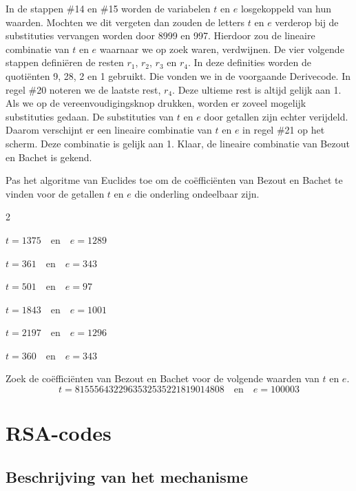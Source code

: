 In de stappen \#14 en \#15 worden de variabelen $t$ en $e$ losgekoppeld van hun waarden. Mochten we dit vergeten dan zouden de letters $t$ en $e$ verderop bij de substituties vervangen worden door 8999 en 997. Hierdoor zou de lineaire combinatie van $t$ en $e$ waarnaar we op zoek waren, verdwijnen. De vier volgende stappen definiëren de resten $r_1$, $r_2$, $r_3$ en $r_4$. In deze definities worden de quotiënten 9, 28, 2 en 1 gebruikt. Die vonden we in de voorgaande Derivecode. In regel \#20 noteren we de laatste rest, $r_4$. Deze ultieme rest is altijd gelijk aan 1. Als we op de vereenvoudigingsknop drukken, worden er zoveel mogelijk substituties gedaan. De substituties van $t$ en $e$ door getallen zijn echter verijdeld. Daarom verschijnt er een lineaire combinatie van $t$ en $e$ in regel \#21 op het scherm. Deze combinatie is gelijk aan 1. Klaar, de lineaire combinatie van Bezout en Bachet is gekend.

\begin{oef}
Pas het algoritme van Euclides toe om de coëfficiënten van Bezout en Bachet te vinden voor de getallen $t$ en $e$ die onderling ondeelbaar zijn.

\begin{enumoef}
\begin{multicols} {2}
\item $t=1375 \quad \textrm{en} \quad e=1289$
\item $t=361 \quad \textrm{en} \quad e=343$
\item $t=501 \quad \textrm{en} \quad e=97$
\item $t=1843 \quad \textrm{en} \quad e=1001$
\item $t=2197 \quad \textrm{en} \quad e=1296$
\item $t=360 \quad \textrm{en} \quad e=343$
\end{multicols}
\end{enumoef}
\end{oef}


\begin{oef} Zoek de coëfficiënten van Bezout en Bachet voor de volgende waarden van $t$ en $e$.
\[t= 8 155 564 322 963 532 535 221 819 014 808 \quad \textrm{en} \quad e=100 003\]
\end{oef}
\newpage




\section{RSA-codes}
\subsection{Beschrijving van het mechanisme}

